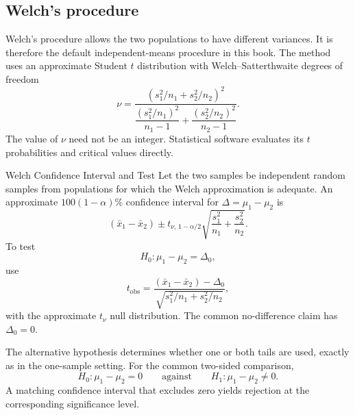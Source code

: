 \subsection{Welch's procedure}

Welch's procedure allows the two populations to have different variances. It is therefore the default independent-means procedure in this book. The method uses an approximate Student $t$ distribution with Welch--Satterthwaite degrees of freedom
\[
\nu
=
\frac{\left(s_1^2/n_1+s_2^2/n_2\right)^2}
{\dfrac{(s_1^2/n_1)^2}{n_1-1}
 +\dfrac{(s_2^2/n_2)^2}{n_2-1}}.
\]
The value of $\nu$ need not be an integer. Statistical software evaluates its $t$ probabilities and critical values directly.

\newpage

\begin{theorem}{Welch Confidence Interval and Test}
Let the two samples be independent random samples from populations for which the Welch approximation is adequate. An approximate $100(1-\alpha)\%$ confidence interval for $\Delta=\mu_1-\mu_2$ is
\[
(\bar x_1-\bar x_2)
\pm
t_{\nu,\,1-\alpha/2}
\sqrt{\frac{s_1^2}{n_1}+\frac{s_2^2}{n_2}}.
\]
To test
\[
H_0:\mu_1-\mu_2=\Delta_0,
\]
use
\[
t_{
\mathrm{obs}}
=
\frac{(\bar x_1-\bar x_2)-\Delta_0}
{\sqrt{s_1^2/n_1+s_2^2/n_2}},
\]
with the approximate $t_\nu$ null distribution. The common no-difference claim has $\Delta_0=0$.
\end{theorem}

The alternative hypothesis determines whether one or both tails are used, exactly as in the one-sample setting. For the common two-sided comparison,
\[
H_0:\mu_1-\mu_2=0
\qquad\text{against}\qquad
H_1:\mu_1-\mu_2\neq0.
\]
A matching confidence interval that excludes zero yields rejection at the corresponding significance level.

